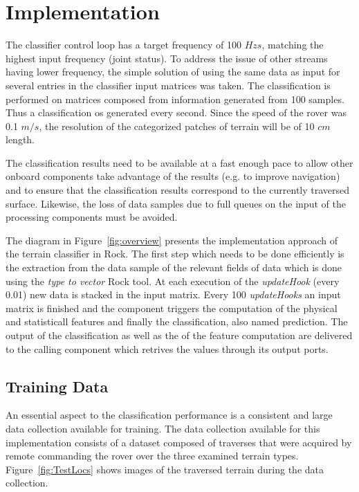 \documentclass{article}
\begin{document}
\section{Implementation}

The classifier control loop has a target frequency of 100 $Hzs$, matching the highest input frequency (joint status). 
To address the issue of other streams having lower frequency, the simple solution of using the same data as input for several entries in the classifier input matrices was taken. 
The classification is performed on matrices composed from information generated from 100 samples. 
Thus a classification os generated every second.
Since the speed of the rover was 0.1 $m/s$, the resolution of the categorized patches of terrain will be of 10 $cm$ length.  


The classification results need to be available at a fast enough pace to allow other onboard components take advantage of the results (e.g. to improve navigation) and to ensure that the classification results correspond to the currently traversed surface. 
Likewise, the loss of data samples due to full queues on the input of the processing components must be avoided. 

The diagram in Figure~\ref{fig:overview} presents the implementation approach of the terrain classifier in Rock. 
The first step which needs to be done efficiently is the extraction from the data sample of the relevant fields of data which is done using the \emph{type to vector} Rock tool.
At each execution of the \emph{updateHook} (every 0.01) new data is stacked in the input matrix.
Every 100 \emph{updateHooks} an input matrix is finished and the component triggers the computation of the physical and statisticall features and finally the classification, also named prediction.
The output of the classification as well as the of the feature computation are delivered to the calling component which retrives the values through its output ports. 


\subsection{Training Data}

An essential aspect to the classification performance is a consistent and large data collection available for training. 
The data collection available for this implementation consists of a dataset composed of traverses that were acquired by remote commanding the rover over the three examined terrain types. 
Figure~\ref{fig:TestLocs} shows images of the traversed terrain during the data collection.
\end{document}
